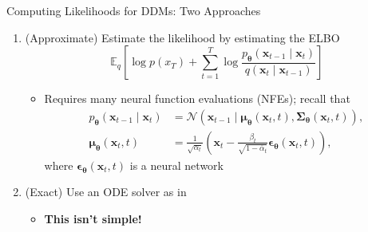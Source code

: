 \documentclass{beamer}
\def\E{\mathbb{E}}
\begin{document}
\begin{frame}{Computing Likelihoods for DDMs: Two Approaches}
    \begin{enumerate}
        \item (Approximate) Estimate the likelihood by estimating the ELBO \cite{murphy2023prob}
        \[
        \E_q\left[\log p(x_T) + \sum_{t = 1}^T \log\frac{p_{\mathbf{\theta}}(\mathbf{x}_{t - 1} \mid \mathbf{x}_t)}{q(\mathbf{x}_t \mid \mathbf{x}_{t - 1})}\right]
        \]
        \begin{itemize}
            \item Requires many neural function evaluations (NFEs); recall that
            \begin{align*}            
                p_{\mathbf{\theta}}(\mathbf{x}_{t - 1} \mid \mathbf{x}_t) &= \mathcal{N}(\mathbf{x}_{t - 1} \mid \mathbf{\mu}_{\mathbf{\theta}}(\mathbf{x}_t, t), \mathbf{\Sigma}_{\mathbf{\theta}}(\mathbf{x}_t, t)), \\
                \mathbf{\mu}_{\mathbf{\theta}}(\mathbf{x}_t, t) &= \frac{1}{\sqrt{\alpha_t}}\left(\mathbf{x}_t - \frac{\beta_t}{\sqrt{1 - \overline{\alpha}_t}}\mathbf{\epsilon}_{\mathbf{\theta}}(\mathbf{x}_t, t)\right),
            \end{align*}
            where $\mathbf{\epsilon}_{\mathbf{\theta}}(\mathbf{x}_t, t)$ is a neural network
        \end{itemize}
        
        \item (Exact) Use an ODE solver as in \cite{song2021scor}
        \begin{itemize}
            \item \textbf{This isn't simple!}
        \end{itemize}
    \end{enumerate}
\end{frame}
    
\end{document}
